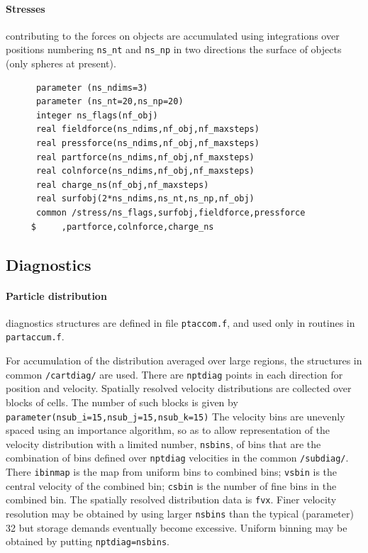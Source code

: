 \documentclass[12pt]{article}
\begin{document}
\paragraph{Stresses} contributing to the forces on objects are
accumulated using integrations over positions numbering \verb!ns_nt! and
\verb!ns_np! in two directions the surface of objects (only
spheres at present). 
\begin{verbatim}
      parameter (ns_ndims=3)
      parameter (ns_nt=20,ns_np=20)
      integer ns_flags(nf_obj)
      real fieldforce(ns_ndims,nf_obj,nf_maxsteps)
      real pressforce(ns_ndims,nf_obj,nf_maxsteps)
      real partforce(ns_ndims,nf_obj,nf_maxsteps)
      real colnforce(ns_ndims,nf_obj,nf_maxsteps)
      real charge_ns(nf_obj,nf_maxsteps)
      real surfobj(2*ns_ndims,ns_nt,ns_np,nf_obj)
      common /stress/ns_flags,surfobj,fieldforce,pressforce
     $     ,partforce,colnforce,charge_ns

\end{verbatim}

\subsection{Diagnostics}

\paragraph{Particle distribution} diagnostics structures are defined in file
\verb!ptaccom.f!, and used only in routines in \verb!partaccum.f!. 

For accumulation of the distribution averaged over large regions, the
structures in common \verb!/cartdiag/! are used.  There are
\verb!nptdiag! points in each direction for position and velocity.
 Spatially resolved velocity distributions
are collected over blocks of cells. The number of such blocks is given
by \verb!parameter(nsub_i=15,nsub_j=15,nsub_k=15)!  The velocity bins
are unevenly spaced using an importance algorithm, so as to allow
representation of the velocity distribution with a limited number,
\verb!nsbins!, of bins that are the combination of bins defined over
\verb!nptdiag! velocities in the common \verb!/subdiag/!.  There
\verb!ibinmap! is the map from uniform bins to combined bins;
\verb!vsbin! is the central velocity of the combined bin; \verb!csbin!
is the number of fine bins in the combined bin. The spatially resolved
distribution data is \verb!fvx!. Finer velocity resolution may be
obtained by using larger \verb!nsbins! than the typical (parameter) 32
but storage demands eventually become excessive.  Uniform binning
may be obtained by putting \verb!nptdiag=nsbins!.
\end{document}
